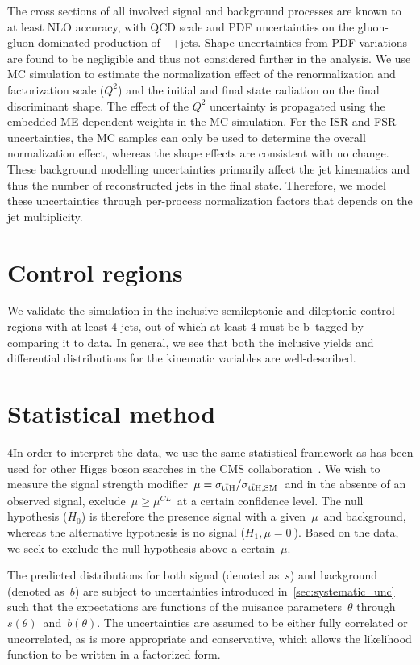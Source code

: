 The cross sections of all involved signal and background processes are known to at least NLO accuracy, with QCD scale and PDF uncertainties on the gluon-gluon dominated production of~\ttbar~+jets. Shape uncertainties from PDF variations are found to be negligible and thus not considered further in the analysis. We use MC simulation to estimate the normalization effect of the renormalization and factorization scale ($Q^2$) and the initial and final state radiation on the final discriminant shape. The effect of the $Q^2$ uncertainty is propagated using the embedded ME-dependent weights in the MC simulation. For the ISR and FSR uncertainties, the MC samples can only be used to determine the overall normalization effect, whereas the shape effects are consistent with no change. These background modelling uncertainties primarily affect the jet kinematics and thus the number of reconstructed jets in the final state. Therefore, we model these uncertainties through per-process normalization factors that depends on the jet multiplicity. 

\section{Control regions}
We validate the simulation in the inclusive semileptonic and dileptonic control regions with at least 4 jets, out of which at least 4 must be b~tagged by comparing it to data. In general, we see that both the inclusive yields and differential distributions for the kinematic variables are well-described.

\section{Statistical method}
\label{sec:statistical_method}
4In order to interpret the data, we use the same statistical framework as has been used for other Higgs boson searches in the CMS collaboration~\cite{Chatrchyan:2012xdj,Chatrchyan:2012tx,ATLAS:2011tau}. We wish to measure the signal strength modifier~$\mu = \sigma_{\mathrm{t} \bar{\mathrm{t}} \mathrm{H}}/\sigma_{\mathrm{t} \bar{\mathrm{t}} \mathrm{H},\mathrm{SM}}$~and in the absence of an observed signal, exclude~$\mu \ge \mu^{CL}$~at a certain confidence level. The null hypothesis ($H_0$) is therefore the presence signal with a given~$\mu$~and background, whereas the alternative hypothesis is no signal ($H_1, \mu = 0~$). Based on the data, we seek to exclude the null hypothesis above a certain~$\mu$.

The predicted distributions for both signal (denoted as~$s$) and background (denoted as~$b$) are subject to uncertainties introduced in~\cref{sec:systematic_unc} such that the expectations are functions of the nuisance parameters~$\theta$ through~$s(\theta)$~and~$b(\theta)$. The uncertainties are assumed to be either fully correlated or uncorrelated, as is more appropriate and conservative, which allows the likelihood function to be written in a factorized form.

